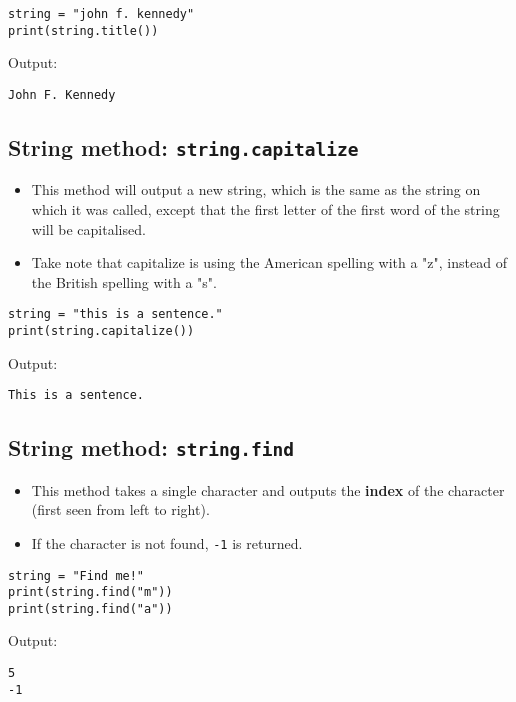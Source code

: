 \documentclass[11pt]{article}
\begin{document}
\begin{verbatim}
string = "john f. kennedy"
print(string.title())
\end{verbatim}

 \noindent Output:

\begin{verbatim}
John F. Kennedy
\end{verbatim}

\subsection{String method: \texttt{string.capitalize}}
\label{sec:orgda86cba}
\begin{itemize}
\item This method will output a new string, which is the same as the string on which it was called, except that the first letter of the first word of the string will be capitalised.
\item Take note that capitalize is using the American spelling with a "z", instead of the British spelling with a "s".
\end{itemize}

\begin{verbatim}
string = "this is a sentence."
print(string.capitalize())
\end{verbatim}

 \noindent Output:

\begin{verbatim}
This is a sentence.
\end{verbatim}

\subsection{String method: \texttt{string.find}}
\label{sec:org4c860c2}
\begin{itemize}
\item This method takes a single character and outputs the \textbf{index} of the character (first seen from left to right).
\item If the character is not found, \texttt{-1} is returned.
\end{itemize}

\begin{verbatim}
string = "Find me!"
print(string.find("m"))
print(string.find("a"))
\end{verbatim}

 \noindent Output:

\begin{verbatim}
5
-1
\end{verbatim}
\end{document}
